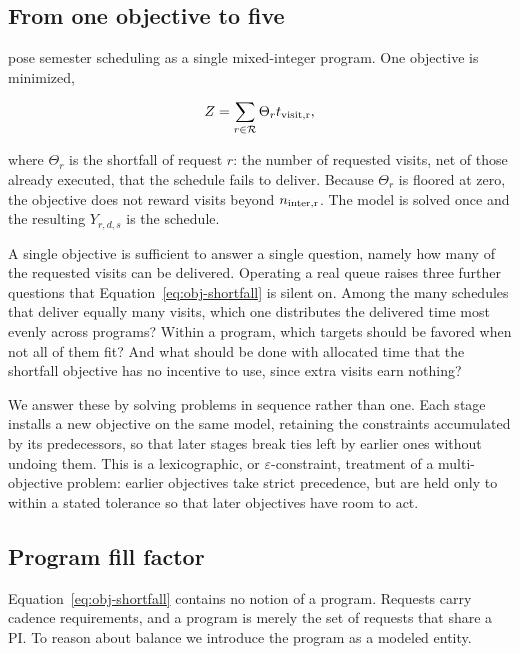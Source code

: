 \documentclass[twocolumn,linenumbers]{aastex63}
\def\Rcal{\mathcal{R}}
\newcommand{\isr}[2]{\ensuremath{#1_{\rm #2}}\xspace}
\begin{document}
\subsection{From one objective to five}
\label{sec:stages:motivation}

\citet{Lubin2025} pose semester scheduling as a single mixed-integer program.
One objective is minimized,

\begin{equation}
  Z = \sum_{r \in \Rcal} \Theta_r \isr{t}{visit,r},
  \label{eq:obj-shortfall}
\end{equation}

\noindent where $\Theta_r$ is the shortfall of request $r$: the number of
requested visits, net of those already executed, that the schedule fails to
deliver. Because $\Theta_r$ is floored at zero, the objective does not reward
visits beyond \isr{n}{inter,r}. The model is solved once and the resulting
$Y_{r,d,s}$ is the schedule.

A single objective is sufficient to answer a single question, namely how many
of the requested visits can be delivered. Operating a real queue raises three
further questions that Equation~\ref{eq:obj-shortfall} is silent on. Among the
many schedules that deliver equally many visits, which one distributes the
delivered time most evenly across programs? Within a program, which targets
should be favored when not all of them fit? And what should be done with
allocated time that the shortfall objective has no incentive to use, since
extra visits earn nothing?

We answer these by solving  problems in sequence rather
than one. Each stage installs a new objective on the same model, retaining the
constraints accumulated by its predecessors, so that later stages break ties
left by earlier ones without undoing them. This is a lexicographic, or
$\varepsilon$-constraint, treatment of a multi-objective problem: earlier
objectives take strict precedence, but are held only to within a stated
tolerance so that later objectives have room to act.

\subsection{Program fill factor}
\label{sec:stages:fill}

Equation~\ref{eq:obj-shortfall} contains no notion of a program. Requests carry
cadence requirements, and a program is merely the set of requests that share a
PI. To reason about balance we introduce the program as a modeled entity.
\end{document}
